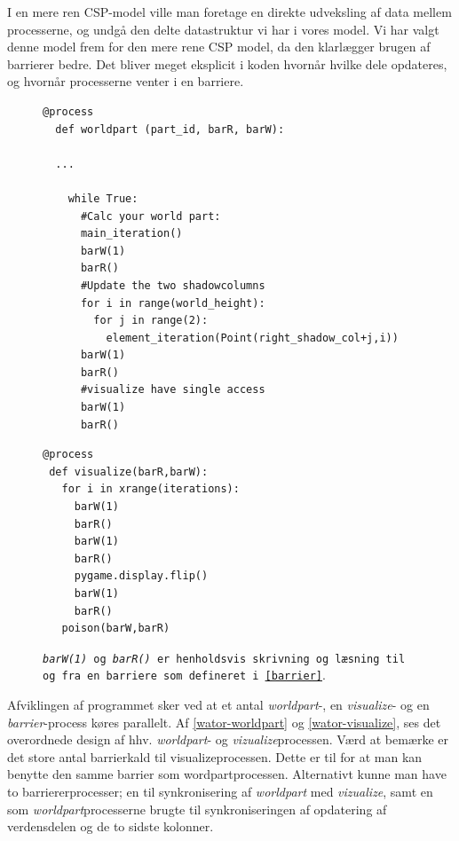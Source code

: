 I en mere ren CSP-model ville man foretage en direkte udveksling af data mellem 
processerne, og undgå den delte datastruktur vi har i vores model.  Vi har 
valgt denne model frem for den mere rene CSP model, da den klarlægger brugen af 
barrierer bedre.  Det bliver meget eksplicit i koden hvornår hvilke dele 
opdateres, og hvornår processerne venter i en barriere.

\begin{figure}[hbtp]
\begin{minipage}{\linewidth}
\begin{lstlisting}[label=wator-worldpart,caption=Uddrag af processen 
  \emph{worldpart} i Wator]
  @process
  def worldpart (part_id, barR, barW):
  
  ...
  
    while True:
      #Calc your world part:
      main_iteration()
      barW(1)
      barR()
      #Update the two shadowcolumns
      for i in range(world_height):
        for j in range(2):
          element_iteration(Point(right_shadow_col+j,i))
      barW(1)
      barR()
      #visualize have single access
      barW(1)
      barR()
\end{lstlisting}

\begin{lstlisting}[label=wator-visualize,caption=Processen \emph{visualize} i 
  Wator]
@process
 def visualize(barR,barW):
   for i in xrange(iterations):
     barW(1)
     barR()
     barW(1)
     barR()
     pygame.display.flip()
     barW(1)
     barR()
   poison(barW,barR)
\end{lstlisting}

\texttt{\emph{barW(1)} og \emph{barR()} er henholdsvis skrivning og læsning til og 
fra en barriere som defineret i \cref{barrier}}. 
\vspace{1cm}
\end{minipage}
\end{figure}
Afviklingen af programmet sker ved at et antal \emph{worldpart}-, en 
\emph{visualize}- og en \emph{barrier}-process køres parallelt. Af 
 \autoref{wator-worldpart} og \vref{wator-visualize}, ses det overordnede design af hhv. \emph{worldpart}- og \emph{vizualize}processen.  Værd at bemærke er det store antal barrierkald til visualizeprocessen. Dette er til for at man kan benytte den samme barrier som wordpartprocessen. Alternativt kunne man have to barriererprocesser; en til synkronisering af \emph{worldpart} med \emph{vizualize}, samt en som \emph{worldpart}processerne brugte til synkroniseringen af opdatering af verdensdelen og de to sidste kolonner. 


